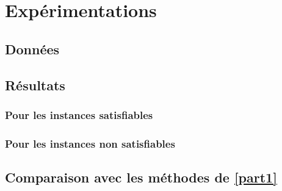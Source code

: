 \chapter{Expérimentations}
	\section{Données}
	\paragraph{}
	\section{Résultats}
	\paragraph{}
		\subsection{Pour les instances satisfiables}
		\paragraph{}
		\subsection{Pour les instances non satisfiables}
		\paragraph{}
	\section{Comparaison avec les méthodes de \ref{part1}}
	\paragraph{}
